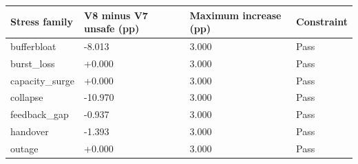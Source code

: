\begin{tabular}{llll}
\toprule
Stress family & V8 minus V7 unsafe (pp) & Maximum increase (pp) & Constraint \\
\midrule
bufferbloat & -8.013 & 3.000 & Pass \\
burst\_loss & +0.000 & 3.000 & Pass \\
capacity\_surge & +0.000 & 3.000 & Pass \\
collapse & -10.970 & 3.000 & Pass \\
feedback\_gap & -0.937 & 3.000 & Pass \\
handover & -1.393 & 3.000 & Pass \\
outage & +0.000 & 3.000 & Pass \\
\bottomrule
\end{tabular}
